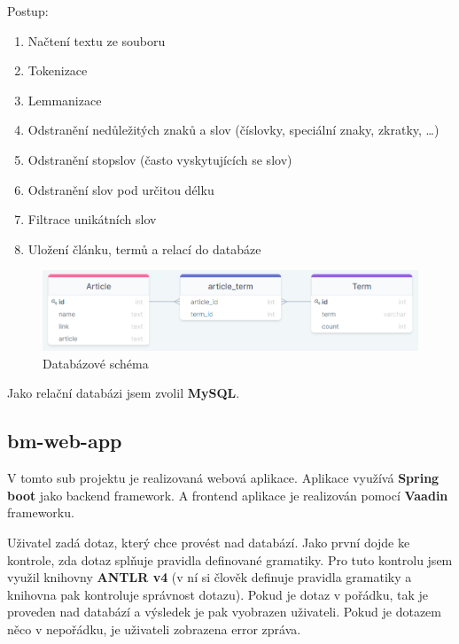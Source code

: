 \documentclass[12pt,a4paper]{article}
\begin{document}
\begin{flushleft}
Postup:
\end{flushleft}
\begin{enumerate}
  \item Načtení textu ze souboru
  \item Tokenizace
  \item Lemmanizace
  \item Odstranění nedůležitých znaků a slov (číslovky, speciální znaky,
  zkratky, …)
  \item Odstranění stopslov (často vyskytujících se slov)
  \item Odstranění slov pod určitou délku
  \item Filtrace unikátních slov
  \item Uložení článku, termů a relací do databáze
\end{enumerate}

\begin{figure}[h]
\includegraphics[width=\textwidth]{./images/database.png}
\caption{Databázové schéma}
\end{figure}

Jako relační databázi jsem zvolil \textbf{MySQL}.

\subsection*{bm-web-app}
V tomto sub projektu je realizovaná webová aplikace. Aplikace využívá
\textbf{Spring boot} jako backend framework. A frontend aplikace je realizován
pomocí \textbf{Vaadin} frameworku.

\begin{flushleft}
Uživatel zadá dotaz, který chce provést nad databází. Jako první dojde ke
kontrole, zda dotaz splňuje pravidla definované gramatiky. Pro tuto kontrolu
jsem využil knihovny \textbf{ANTLR v4} (v ní si člověk definuje pravidla
gramatiky a knihovna pak kontroluje správnost dotazu). Pokud je dotaz v
pořádku, tak je proveden nad databází a výsledek je pak vyobrazen uživateli.
Pokud je dotazem něco v nepořádku, je uživateli zobrazena error zpráva.
\end{flushleft}
\end{document}
